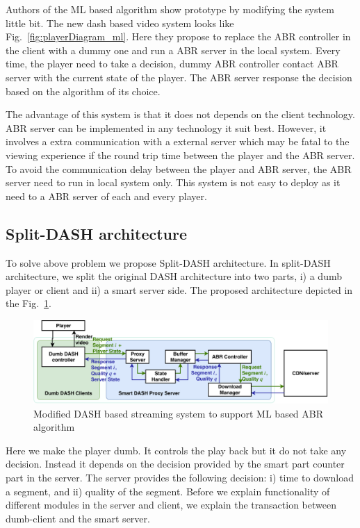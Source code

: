 Authors of the ML based algorithm show prototype by modifying the system little bit. The new dash based video system looks like Fig.~\ref{fig:playerDiagram_ml}. Here they propose to replace the ABR controller in the client with a dummy one and run a ABR server in the local system. Every time, the player need to take a decision, dummy ABR controller contact ABR server with the current state of the player. The ABR server response the decision based on the algorithm of its choice.

The advantage of this system is that it does not depends on the client technology. ABR server can be implemented in any technology it suit best. However, it involves a extra communication with a external server which may be fatal to the viewing experience if the round trip time between the player and the ABR server. To avoid the communication delay between the player and ABR server, the ABR server need to run in local system only. This system is not easy to deploy as it need to a ABR server of each and every player.

\subsection{Split-DASH architecture}
To solve above problem we propose Split-DASH architecture. In split-DASH architecture, we split the original DASH architecture into two parts, i) a dumb player or client and ii) a smart server side. The proposed architecture depicted in the Fig.~\ref{fig:playerDiagram_split}.
\begin{figure}[ht]
	\begin{center}
		\includegraphics[width=0.9\linewidth]{img/playerDiagram_split}
	\end{center}
	\caption{\label{fig:playerDiagram_split} Modified DASH based streaming system to support ML based ABR algorithm}
\end{figure}
Here we make the player dumb. It controls the play back but it do not take any decision. Instead it depends on the decision provided by the smart part counter part in the server. The server provides the following decision: i) time to download a segment, and ii) quality of the segment. Before we explain functionality of different modules in the server and client, we explain the transaction between dumb-client and the smart server. 

